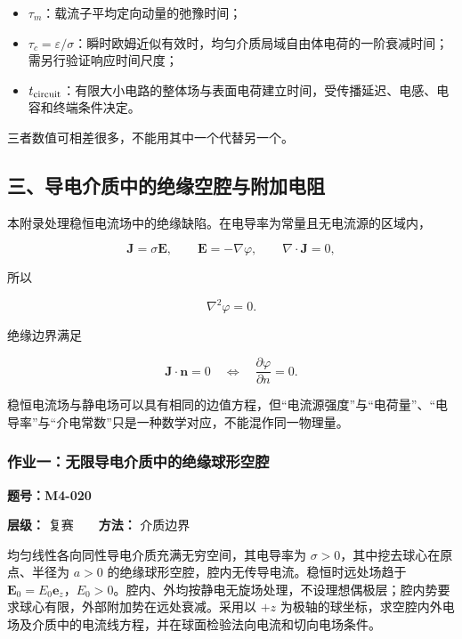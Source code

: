 \begin{itemize}
\tightlist
\item
  \(\tau_m\)：载流子平均定向动量的弛豫时间；
\item
  \(\tau_c=\varepsilon/\sigma\)：瞬时欧姆近似有效时，均匀介质局域自由体电荷的一阶衰减时间；需另行验证响应时间尺度；
\item
  \(t_{\rm circuit}\)：有限大小电路的整体场与表面电荷建立时间，受传播延迟、电感、电容和终端条件决定。
\end{itemize}

三者数值可相差很多，不能用其中一个代替另一个。

\subsection{三、导电介质中的绝缘空腔与附加电阻}\label{m4:ux4e09ux5bfcux7535ux4ecbux8d28ux4e2dux7684ux7eddux7f18ux7a7aux8154ux4e0eux9644ux52a0ux7535ux963b}

本附录处理稳恒电流场中的绝缘缺陷。在电导率为常量且无电流源的区域内，

\[
\mathbf J=\sigma\mathbf E,
\qquad
\mathbf E=-\nabla\varphi,
\qquad
\nabla\cdot\mathbf J=0,
\]

所以

\[
\nabla^2\varphi=0.
\]

绝缘边界满足

\[
\boxed{
\mathbf J\cdot\mathbf n=0
\quad\Longleftrightarrow\quad
\frac{\partial\varphi}{\partial n}=0
}.
\]

稳恒电流场与静电场可以具有相同的边值方程，但``电流源强度''与``电荷量''、``电导率''与``介电常数''只是一种数学对应，不能混作同一物理量。

\par{}
\noindent\begin{minipage}{\linewidth}

\subsubsection{作业一：无限导电介质中的绝缘球形空腔}\label{m4:ux4f5cux4e1aux4e00ux65e0ux9650ux5bfcux7535ux4ecbux8d28ux4e2dux7684ux7eddux7f18ux7403ux5f62ux7a7aux8154}

\textbf{题号：M4-020}

\textbf{层级：} 复赛　　\textbf{方法：} 介质边界

均匀线性各向同性导电介质充满无穷空间，其电导率为
\(\sigma>0\)，其中挖去球心在原点、半径为 \(a>0\)
的绝缘球形空腔，腔内无传导电流。稳恒时远处场趋于
\(\mathbf E_0=E_0\mathbf e_z\)，\(E_0>0\)。腔内、外均按静电无旋场处理，不设理想偶极层；腔内势要求球心有限，外部附加势在远处衰减。采用以
\(+z\)
为极轴的球坐标，求空腔内外电场及介质中的电流线方程，并在球面检验法向电流和切向电场条件。

\end{minipage}\par

